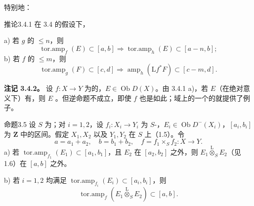 特别地：
\begin{SGAresult}{推论}{3.4.1}
在 3.4 的假设下，

a) 若 $g$ 的 $\le n$，则
\[\operatorname{tor.amp}_f(E)\subset[a,b]\Longrightarrow\operatorname{tor.amp}_h(E)\subset[a-n,b];\]
b) 若 $f$ 的 $\le m$，则
\[\operatorname{tor.amp}_g(F)\subset[c,d]\Longrightarrow\operatorname{amp}_h(\mathrm Lf^*F)\subset[c-m,d].\]
\end{SGAresult}
\textbf{注记 3.4.2。} 设 $f:X\to Y$ 为的，$E\in\operatorname{Ob}D(X)$。由 3.4.1 a)，若 $E$（在绝对意义下）有，则 $E$ 。但逆命题不成立，即使 $f$ 也是如此；域上的一个的就提供了例子。
\begin{SGAresult}{命题}{3.5}
设 $S$ 为；对 $i=1,2$，设 $f_i:X_i\to Y_i$ 为 $S$-，$E_i\in\operatorname{Ob}D^-(X_i)$，$[a_i,b_i]$ 为 $\mathbf Z$ 中的区间。假定 $X_1,X_2$ 以及 $Y_1,Y_2$ 在 $S$ 上（1.5）。令
\[a=a_1+a_2,\quad b=b_1+b_2,\quad f=f_1\times_Sf_2:X\longrightarrow Y.\]
a) 若 $\operatorname{tor.amp}_{f_1}(E_1)\subset[a_1,b_1]$，且 $E_2$ 在 $[a_2,b_2]$ 之外，则 $E_1\mathbin{\overset{\mathrm L}{\otimes}}_SE_2$（见 1.6）在 $[a,b]$ 之外。

b) 若 $i=1,2$ 均满足 $\operatorname{tor.amp}_{f_i}(E_i)\subset[a_i,b_i]$，则
\[\operatorname{tor.amp}_f(E_1\mathbin{\overset{\mathrm L}{\otimes}}_SE_2)\subset[a,b].\]
\end{SGAresult}
